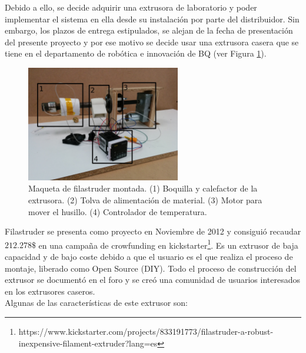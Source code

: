 Debido a ello, se decide adquirir una extrusora de laboratorio y poder implementar el sistema en ella desde su instalación por parte del distribuidor. Sin embargo, los plazos de entrega estipulados, se alejan de la fecha de presentación del presente proyecto y por ese motivo se decide usar una extrusora casera que se tiene en el departamento de robótica e innovación de BQ (ver Figura \ref{fig:hardware_filastruder}).\\

    \begin{figure}[H]
            \centering
            \includegraphics[width=0.6\textwidth]{images/filaextruder/IMG_20150313_11163.jpg}
            \caption[Maqueta de filastruder montada]{Maqueta de filastruder montada. (1) Boquilla y calefactor de la extrusora. (2) Tolva de alimentación de material. (3) Motor para mover el husillo. (4) Controlador de temperatura.}
            \label{fig:hardware_filastruder}
    \end{figure}

Filastruder se presenta como proyecto en Noviembre de 2012 \cite{filastruder} y consiguió recaudar $212.278 \$$ en una campaña de crowfunding en kickstarter\footnote{https://www.kickstarter.com/projects/833191773/filastruder-a-robust-inexpensive-filament-extruder?lang=es}. Es un extrusor de baja capacidad y de bajo coste debido a que el usuario es el que realiza el proceso de montaje, liberado como Open Source (DIY). Todo el proceso de construcción del extrusor se documentó en el foro y se creó una comunidad de usuarios interesados en los extrusores caseros.\\

Algunas de las características de este extrusor son:

